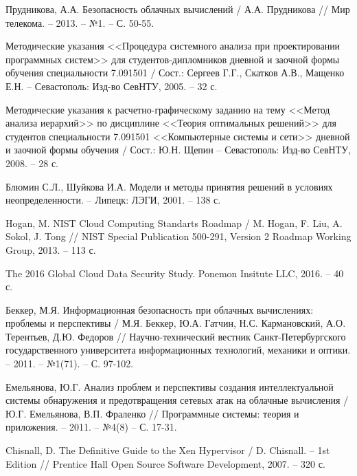 \begingroup
\renewcommand{\section}[2]{\anonsection{Библиографический список}}
\begin{thebibliography}{00}

    Прудникова, А.А.
    Безопасность облачных вычислений /
    А.А. Прудникова //
    Мир телекома. -- 2013. -- №1. -- С. 50-55.

    Методические указания <<Процедура системного анализа при проектировании программных систем>>
    для студентов-дипломников дневной и заочной формы обучения специальности 7.091501 /
    Сост.: Сергеев Г.Г., Скатков А.В., Мащенко Е.Н. -- Севастополь:
    Изд-во СевНТУ, 2005. -- 32 с.

    Методические указания к расчетно-графическому заданию
    на тему <<Метод анализа иерархий>>  по дисциплине <<Теория оптимальных решений>>
    для студентов специальности 7.091501 <<Компьютерные системы и сети>>
    дневной и заочной формы обучения /
    Сост.: Ю.Н. Щепин -- Севастополь:
    Изд-во СевНТУ, 2008. -- 28 с.

    Блюмин С.Л., Шуйкова И.А.
    Модели и методы принятия решений в условиях неопределенности. --
    Липецк: ЛЭГИ, 2001. -- 138 с.

    Hogan, M.
    NIST Cloud Computing Standarts Roadmap /
    M. Hogan, F. Liu, A. Sokol, J. Tong //
    NIST Special Publication 500-291, Version 2
    Roadmap Working Group, 2013. -- 113 с.

    The 2016 Global Cloud Data Security Study.
    Ponemon Insitute LLC, 2016. -- 40 с.

    Беккер, М.Я.
    Информационная безопасность при облачных вычислениях: проблемы и перспективы /
    М.Я. Беккер, Ю.А. Гатчин, Н.С. Кармановский, А.О. Терентьев, Д.Ю. Федоров //
    Научно-технический вестник Санкт-Петербургского государственного университета информационных технологий, механики и оптики. -- 2011. -- №1(71). -- С. 97-102.

    Емельянова, Ю.Г.
    Анализ проблем и перспективы создания интеллектуальной системы обнаружения и предотвращения сетевых атак на облачные вычисления /
    Ю.Г. Емельянова, В.П. Фраленко //
    Программные системы: теория и приложения. -- 2011. -- №4(8) -- С. 17-31.

    Chisnall, D.
    The Definitive Guide to the Xen Hypervisor /
    D. Chisnall. --
    1st Edition //
    Prentice Hall Open Source Software Development, 2007. -- 320 с.


\end{thebibliography}

